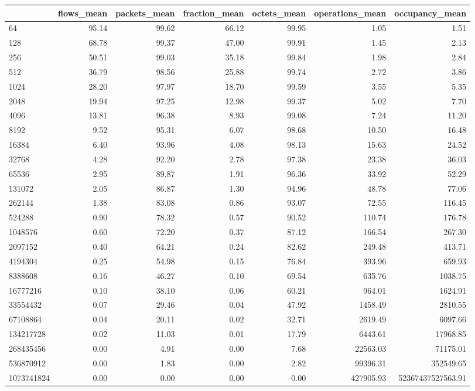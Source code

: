 \begin{tabular}{lrrrrrr}
\toprule
 & flows_mean & packets_mean & fraction_mean & octets_mean & operations_mean & occupancy_mean \\
\midrule
64 & 95.14 & 99.62 & 66.12 & 99.95 & 1.05 & 1.51 \\
128 & 68.78 & 99.37 & 47.00 & 99.91 & 1.45 & 2.13 \\
256 & 50.51 & 99.03 & 35.18 & 99.84 & 1.98 & 2.84 \\
512 & 36.79 & 98.56 & 25.88 & 99.74 & 2.72 & 3.86 \\
1024 & 28.20 & 97.97 & 18.70 & 99.59 & 3.55 & 5.35 \\
2048 & 19.94 & 97.25 & 12.98 & 99.37 & 5.02 & 7.70 \\
4096 & 13.81 & 96.38 & 8.93 & 99.08 & 7.24 & 11.20 \\
8192 & 9.52 & 95.31 & 6.07 & 98.68 & 10.50 & 16.48 \\
16384 & 6.40 & 93.96 & 4.08 & 98.13 & 15.63 & 24.52 \\
32768 & 4.28 & 92.20 & 2.78 & 97.38 & 23.38 & 36.03 \\
65536 & 2.95 & 89.87 & 1.91 & 96.36 & 33.92 & 52.29 \\
131072 & 2.05 & 86.87 & 1.30 & 94.96 & 48.78 & 77.06 \\
262144 & 1.38 & 83.08 & 0.86 & 93.07 & 72.55 & 116.45 \\
524288 & 0.90 & 78.32 & 0.57 & 90.52 & 110.74 & 176.78 \\
1048576 & 0.60 & 72.20 & 0.37 & 87.12 & 166.54 & 267.30 \\
2097152 & 0.40 & 64.21 & 0.24 & 82.62 & 249.48 & 413.71 \\
4194304 & 0.25 & 54.98 & 0.15 & 76.84 & 393.96 & 659.93 \\
8388608 & 0.16 & 46.27 & 0.10 & 69.54 & 635.76 & 1038.75 \\
16777216 & 0.10 & 38.10 & 0.06 & 60.21 & 964.01 & 1624.91 \\
33554432 & 0.07 & 29.46 & 0.04 & 47.92 & 1458.49 & 2810.55 \\
67108864 & 0.04 & 20.11 & 0.02 & 32.71 & 2619.49 & 6097.66 \\
134217728 & 0.02 & 11.03 & 0.01 & 17.79 & 6443.61 & 17968.85 \\
268435456 & 0.00 & 4.91 & 0.00 & 7.68 & 22563.03 & 71175.01 \\
536870912 & 0.00 & 1.83 & 0.00 & 2.82 & 99396.31 & 352549.65 \\
1073741824 & 0.00 & 0.00 & 0.00 & -0.00 & 427905.93 & 52367437527563.91 \\
\bottomrule
\end{tabular}
